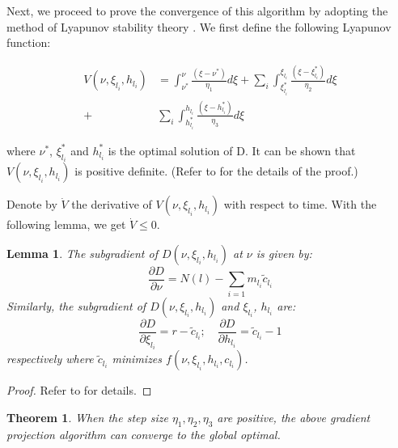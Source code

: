 \documentclass[10pt,conference]{IEEEtran}
\newtheorem{Theorem}{Theorem}
\newtheorem{lemma}{Lemma}
\begin{document}
Next, we proceed to prove the convergence of this algorithm by adopting the method of Lyapunov stability theory {\cite{Control}}. We first define the following Lyapunov function:
\begin{small}
\begin{equation}
\begin{split}
V(\nu,\xi_{l_i},h_{l_i}) &= \int_{\nu^*}^{\nu}\frac{(\xi - \nu^*)}{\eta_1}d \xi + \sum_{i}\int_{\xi_{l_i}^*}^{\xi_{l_i}}\frac{(\xi - \xi_{l_i}^*)}{\eta_2}d \xi\\ + & \sum_{i}\int_{h_{l_i}^*}^{h_{l_i}}\frac{(\xi - h_{l_i}^*)}{\eta_3}d \xi
\end{split}
\end{equation}
\end{small}
where $\nu^*$,  $\xi_{l_i}^*$ and $h_{l_i}^*$ is the optimal solution of D. It can be shown that $V(\nu,\xi_{l_i},h_{l_i})$ is positive definite. (Refer to \cite{speculative-multi-job} for the details of the proof.)

Denote by $\dot{V}$ the derivative of $V(\nu,\xi_{l_i},h_{l_i})$ with respect to time. With the following lemma, we get $\dot{V} \leq 0$.
\begin{lemma}
The subgradient of $D(\nu,\xi_{l_i},h_{l_i})$ at $\nu$ is given by:
$$\frac{\partial D}{\partial \nu} = N(l) - \sum_{i=1}m_{l_i}\tilde{c}_{l_i}$$
Similarly, the subgradient of $D(\nu,\xi_{l_i},h_{l_i})$ and $\xi_{l_i}$, $h_{l_i}$ are:
$$
\frac{\partial D}{\partial \xi_{l_i}} = r - \tilde{c}_{l_i}; \quad \frac{\partial D}{\partial h_{l_i}} = \tilde{c}_{l_i} - 1
$$
respectively where $\tilde{c}_{l_i}$ minimizes $ f(\nu,\xi_{l_i},h_{l_i},c_{l_i})$.
\end{lemma}

\begin{proof}
Refer to \cite{speculative-multi-job} for details.
\end{proof}

\begin{Theorem}
\label{Theorem 1}
When the step size $\eta_1, \eta_2,\eta_3$ are positive, the above gradient projection algorithm can converge to the global optimal.
\end{Theorem}
\end{document}
